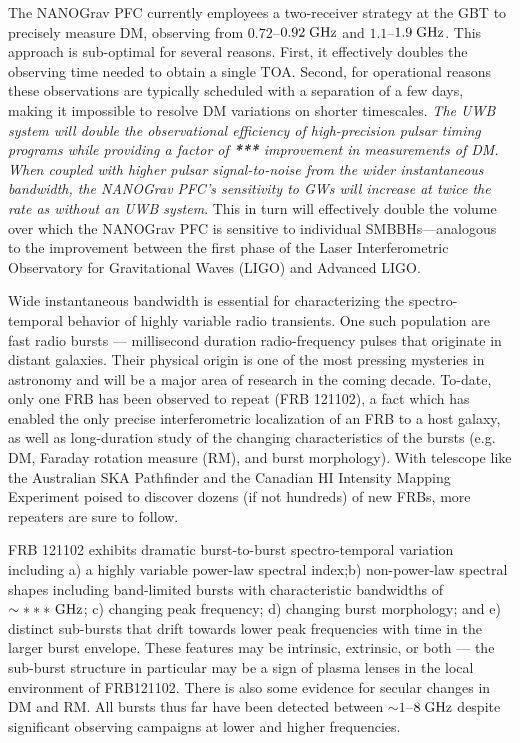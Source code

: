 \documentclass[10pt]{myNSF}
\begin{document}
The NANOGrav PFC currently employees a two-receiver strategy at the
GBT to precisely measure DM, observing from $0.72$--$0.92\; \textrm{GHz}$ and
$1.1$--$1.9\; \textrm{GHz}$.  This approach is sub-optimal for several reasons.
First, it effectively doubles the observing time needed to obtain a
single TOA.  Second, for operational reasons these observations are
typically scheduled with a separation of a few days, making it
impossible to resolve DM variations on shorter timescales.  \emph{The
  UWB system will double the observational efficiency of
  high-precision pulsar timing programs while providing a factor of
  \textbf{***} improvement in measurements of DM.  When coupled with
  higher pulsar signal-to-noise from the wider instantaneous
  bandwidth, the NANOGrav PFC's sensitivity to GWs will increase at
  twice the rate as without an UWB system}.  This in turn will
effectively double the volume over which the NANOGrav PFC is sensitive
to individual SMBBHs---analogous to the improvement between the first
phase of the Laser Interferometric Observatory for Gravitational Waves
(LIGO) and Advanced LIGO.

 Wide instantaneous bandwidth is
essential for characterizing the spectro-temporal behavior of highly
variable radio transients.  One such population are fast radio bursts
--- millisecond duration radio-frequency pulses that originate in
distant galaxies.  Their physical origin is one of the most pressing
mysteries in astronomy and will be a major area of research in the
coming decade.  To-date, only one FRB has been observed to repeat (FRB
121102), a fact which has enabled the only precise interferometric
localization of an FRB to a host galaxy, as well as long-duration
study of the changing characteristics of the bursts (e.g. DM, Faraday
rotation measure (RM), and burst morphology).  With telescope like the
Australian SKA Pathfinder and the Canadian HI Intensity Mapping
Experiment poised to discover dozens (if not hundreds) of new FRBs,
more repeaters are sure to follow.

FRB 121102 exhibits dramatic burst-to-burst spectro-temporal variation
including a) a highly variable power-law spectral index;b)
non-power-law spectral shapes including band-limited bursts with
characteristic bandwidths of $\sim***\ \GHz$; c) changing peak
frequency; d) changing burst morphology; and e) distinct sub-bursts
that drift towards lower peak frequencies with time in the larger
burst envelope.  These features may be intrinsic, extrinsic, or
both --- the sub-burst structure in particular may be a sign of plasma
lenses in the local environment of FRB121102.  There is also some
evidence for secular changes in DM and RM.  All bursts thus far have
been detected between $\sim 1$--$8\; \textrm{GHz}$ despite significant
observing campaigns at lower and higher frequencies.
\end{document}
